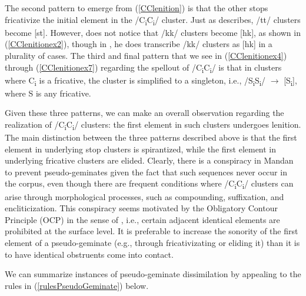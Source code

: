 The second pattern to emerge from (\ref{CClenition}) is that the other stops fricativize the initial element in the /C\textsubscript{i}C\textsubscript{i}/ cluster. Just as \citet[37]{hollow1970} describes, /tt/ clusters become [st]. However, \citeauthor{hollow1970} does not notice that /kk/ clusters become [hk], as shown in (\ref{CClenitionex2}), though in \citet{hollow1973a}, he does transcribe /kk/ clusters as [hk] in a plurality of cases. The third and final pattern that we see in (\ref{CClenitionex4}) through (\ref{CClenitionex7}) regarding the spellout of /C\textsubscript{i}C\textsubscript{i}/ is that in clusters where C\textsubscript{i} is a fricative, the cluster is simplified to a singleton, i.e., /S\textsubscript{i}S\textsubscript{i}/ $\to$ [S\textsubscript{i}], where S is any fricative.

Given these three patterns, we can make an overall observation regarding the realization of /C\textsubscript{i}C\textsubscript{i}/ clusters: the first element in such clusters undergoes lenition. The main distinction between the three patterns described above is that the first element in underlying stop clusters is spirantized, while the first element in underlying fricative clusters are elided. Clearly, there is a conspiracy in Mandan to prevent pseudo-geminates given the fact that such sequences never occur in the corpus, even though there are frequent conditions where /C\textsubscript{i}C\textsubscript{i}/ clusters can arise through morphological processes, such as compounding, suffixation, and encliticization. This conspiracy seems motivated by the Obligatory Contour Principle (OCP) in the sense of \citet{mccarthy1986}, i.e., certain adjacent identical elements are prohibited at the surface level. It is preferable to increase the sonority of the first element of a pseudo-geminate (e.g., through fricativizating or eliding it) than it is to have identical obstruents come into contact.

We can summarize instances of pseudo-geminate dissimilation by appealing to the rules in (\ref{rulesPseudoGeminate}) below.

